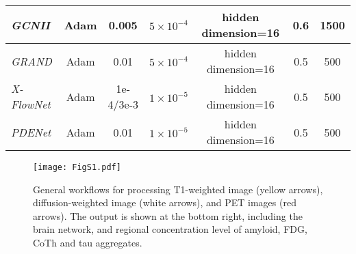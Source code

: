 \documentclass{article}
\begin{document}
\begin{table}[h]
\begin{center}
\begin{small}
\begin{tabular}{lcccccc}
\hline
  \textit{GCNII} & Adam &  0.005  & $5\times 10^{-4}$ & hidden dimension=16 & 0.6 &1500\\
\hline
  \textit{GRAND} & Adam &  0.01  & $5\times 10^{-4}$ & hidden dimension=16 & 0.5 &500\\
\hline
  \textit{X-FlowNet} & Adam &  1e-4/3e-3  & $1\times 10^{-5}$ & hidden dimension=16 & 0.5 &500\\
\hline
  \textit{PDENet} & Adam &  0.01  & $1\times 10^{-5}$ & hidden dimension=16 & 0.5 &500\\
\hline
\bottomrule
\end{tabular}
\end{small}
\end{center}
\vskip -0.1in
\end{table}

\begin{figure}[h]
\vskip -0.2in
\centerline{\texttt{[image: FigS1.pdf]}}
\caption{General workflows for processing T1-weighted image (yellow arrows), diffusion-weighted image (white arrows), and PET images (red arrows). The output is shown at the bottom right, including the brain network, and regional concentration level of amyloid, FDG, CoTh and tau aggregates.}
{\vspace{-15pt}}
\label{figs1}
\end{figure}

\begin{table}[h]
  \caption{Dataset statistics.}
  \centering
  \renewcommand\arraystretch{0.5}
  \label{tables3}
\end{table}
\end{document}
